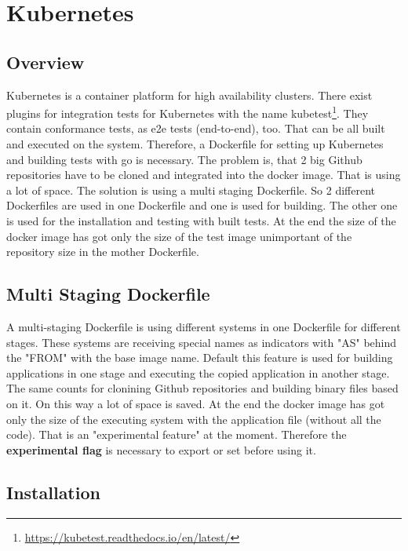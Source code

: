 \chapter{Kubernetes}\label{ch:kubernetes}

\section{Overview}

Kubernetes is a container platform for high availability clusters.
There exist plugins for integration tests for Kubernetes with the name kubetest\footnote{\url{https://kubetest.readthedocs.io/en/latest/}}. They contain conformance tests, as e2e tests (end-to-end), too.
That can be all built and executed on the system. Therefore, a Dockerfile for setting up Kubernetes and building tests with go is necessary. The problem is, that 2 big Github repositories have to be cloned and integrated into the docker image. That is using a lot of space. The solution is using a multi staging Dockerfile. 
So 2 different Dockerfiles are used in one Dockerfile and one is used for building. The other one is used for the installation and testing with built tests. At the end the size of the docker image has got only the size of the test image unimportant of the repository size in the mother Dockerfile.

\section{Multi Staging Dockerfile}

A multi-staging Dockerfile is using different systems in one Dockerfile for different stages. These systems are receiving special names as indicators with "AS" behind the "FROM" with the base image name. 
Default this feature is used for building applications in one stage and executing the copied application in another stage. The same counts for clonining Github repositories and building binary files based on it. On this way a lot of space is saved.
At the end the docker image has got only the size of the executing system with the application file (without all the code). 
That is an "experimental feature"  at the moment. Therefore the \textbf{experimental flag} is necessary to export or set before using it. 

\section{Installation}

